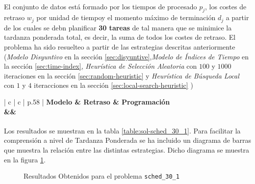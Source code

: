 \documentclass[spanish]{article}
\begin{document}
			\paragraph{}
			El conjunto de datos está formado por los tiempos de procesado $p_j$, los costes de retraso $w_j$ por unidad de tiempoy el momento máximo de terminación $d_j$ a partir de los cuales se debn planificar \textbf{30 tareas} de tal manera que se minimice la tardanza ponderada total, es decir, la suma de todos los costes de retraso. El problema ha sido resuelteo a partir de las estrategias descritas anteriormente (\emph{Modelo Disyuntivo} en la sección \ref{sec:disyuntive},\emph{Modelo de Índices de Tiempo} en la sección \ref{sec:time-index}, \emph{Heurística de Selección Aleatoria} con $100$ y $1000$ iteraciones en la sección \ref{sec:random-heuristic} y \emph{Heurística de Búsqueda Local} con $1$ y $4$ iteracciones en la sección \ref{sec:local-search-heuristic} )


			\begin{table}
				\centering
				\begin{tabu}{ | c | c | p{.58\linewidth} |}
					\hline
					\bfseries Modelo & \bfseries Retraso & \bfseries Programación
					{\\\hline\model&\delay&\schedule}
					\\\hline
				\end{tabu}
				\caption{Resultados Obtenidos para el problema \texttt{sched\_30\_1}}
				\label{table:sol-sched_30_1}
			\end{table}

			\paragraph{}
			Los resultados se muestran en la tabla \ref{table:sol-sched_30_1}. Para facilitar la comprensión a nivel de Tardanza Ponderada se ha incluido un diagrama de barras que muestra la relación entre las distintas estrategias. Dicho diagrama se muestra en la figura \ref{plot:sol-sched_30_1}.


			\begin{figure}
				\begin{center}
				\end{center}
				\caption{Resultados Obtenidos para el problema \texttt{sched\_30\_1}}
				\label{plot:sol-sched_30_1}
			\end{figure}
\end{document}
